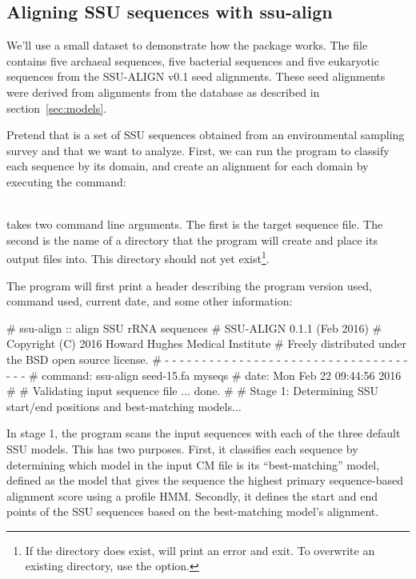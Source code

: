 \subsection{Aligning SSU sequences with ssu-align}

We'll use a small dataset to demonstrate how the package works.
The file  contains five archaeal sequences, five
bacterial sequences and five eukaryotic sequences from the
SSU-ALIGN v0.1 seed alignments. These seed alignments
were derived from alignments from the  database
\cite{CannoneGutell02} as described in section~\ref{sec:models}.

Pretend that  is a set of SSU sequences obtained from
an environmental sampling survey and that we want to analyze. First,
we can run the  program to classify each sequence by
its domain, and create an alignment for each domain by executing the
command:

\\

 takes two command line arguments. The first is the
target sequence file. The second is the name of a directory that the
program will create and place its output files into. This directory
should not yet exist\footnote{If the directory does exist,
   will print an error and exit. To overwrite an
  existing directory, use the  option.}.

The program will first print a header describing the program version
used, command used, current date, and some other information:

\begin{sreoutput}
# ssu-align :: align SSU rRNA sequences
# SSU-ALIGN 0.1.1 (Feb 2016)
# Copyright (C) 2016 Howard Hughes Medical Institute
# Freely distributed under the BSD open source license.
# - - - - - - - - - - - - - - - - - - - - - - - - - - - - - - - - - - - -
# command: ssu-align seed-15.fa myseqs
# date:    Mon Feb 22 09:44:56 2016
#
# Validating input sequence file ... done.
#
# Stage 1: Determining SSU start/end positions and best-matching models...
\end{sreoutput}

In stage 1, the program scans the input sequences with each of the
three default SSU models. This has two purposes.  First, it classifies
each sequence by determining which model in the input CM file is its
``best-matching'' model, defined as
the model that gives the sequence the highest primary sequence-based
alignment score using a profile HMM\@. Secondly, it
defines the start and end points of the SSU sequences based on the
best-matching model's alignment.


